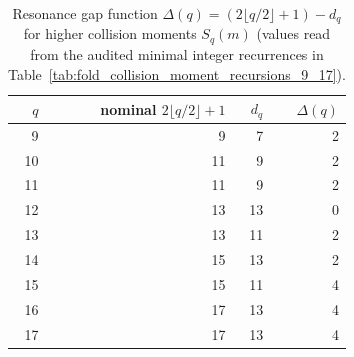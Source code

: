 \begin{table}[H]
\centering
\scriptsize
\setlength{\tabcolsep}{6pt}
\caption{Resonance gap function $\Delta(q)=(2\lfloor q/2\rfloor+1)-d_q$ for higher collision moments $S_q(m)$ (values read from the audited minimal integer recurrences in Table~\ref{tab:fold_collision_moment_recursions_9_17}).}
\label{tab:fold_collision_resonance_gap_delta_q_9_17}
\begin{tabular}{r r r r}
\toprule
$q$ & nominal $2\lfloor q/2\rfloor+1$ & $d_q$ & $\Delta(q)$\\
\midrule
9 & 9 & 7 & 2\\
10 & 11 & 9 & 2\\
11 & 11 & 9 & 2\\
12 & 13 & 13 & 0\\
13 & 13 & 11 & 2\\
14 & 15 & 13 & 2\\
15 & 15 & 11 & 4\\
16 & 17 & 13 & 4\\
17 & 17 & 13 & 4\\
\bottomrule
\end{tabular}
\end{table}
